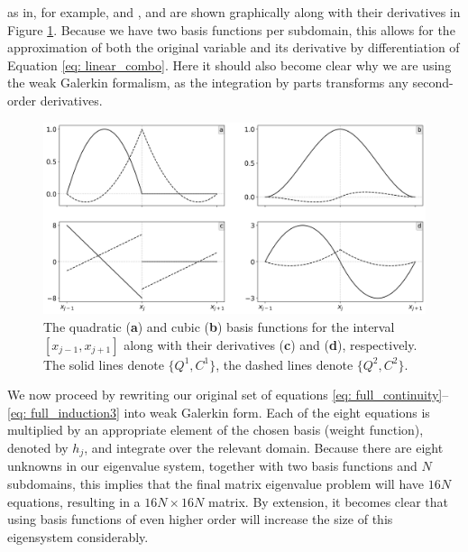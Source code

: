 \endgroup
as in, for example, \citet{kerner1998} and \citet{book_MHD}, and are shown graphically along with their derivatives in Figure \ref{fig: basisfunctions}. Because we have two basis functions per subdomain, this allows for the approximation of both the original variable and its derivative by differentiation of Equation \eqref{eq: linear_combo}. Here it should also become clear why we are using the weak Galerkin formalism, as the integration by parts transforms any second-order derivatives.

\begin{figure}[t]
  \centering
  \includegraphics[width=\textwidth]{basisfunctions.png}
  \caption{
    The quadratic (\textbf{a}) and cubic (\textbf{b}) basis functions for the interval $[x_{j-1}, x_{j+1}]$ along with their derivatives (\textbf{c}) and (\textbf{d}), respectively. The solid lines denote $\{Q^1, C^1\}$, the dashed lines denote $\{Q^2, C^2\}$.
  }
  \label{fig: basisfunctions}
\end{figure}

We now proceed by rewriting our original set of equations \eqref{eq: full_continuity}--\eqref{eq: full_induction3} into weak Galerkin form. Each of the eight equations is multiplied by an appropriate element of the chosen basis (weight function), denoted by $h_j$, and integrate over the relevant domain. Because there are eight unknowns in our eigenvalue system, together with two basis functions and $N$ subdomains, this implies that the final matrix eigenvalue problem will have $16 N$ equations, resulting in a $16N \times 16N$ matrix. By extension, it becomes clear that using basis functions of even higher order will increase the size of this eigensystem considerably.

